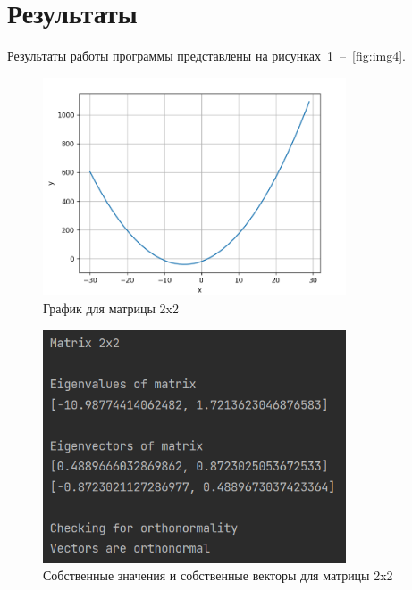 \documentclass[a4paper, 14pt]{extarticle}
\begin{document}
\section{Результаты}\label{Sect::res}

Результаты работы программы представлены на рисунках~\ref{fig:img1}~--~\ref{fig:img4}.  

\begin{figure}[!htb]
	\centering
	\includegraphics[width=0.8\textwidth]{img1}
\caption{График для матрицы 2x2}
\label{fig:img1}
\end{figure}

\begin{figure}[!htb]
	\centering
	\includegraphics[width=0.8\textwidth]{img2}
\caption{Собственные значения и собственные векторы для матрицы 2x2}
\label{fig:img2}
\end{figure}
\end{document}
